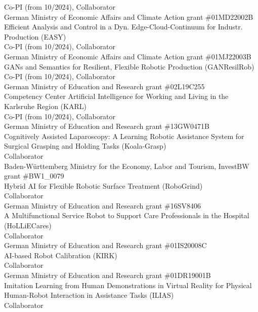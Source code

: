 \documentclass[11pt]{article} %
\begin{document}
Co-PI (from 10/2024), Collaborator\\
German Ministry of Economic Affairs and Climate Action grant \#01MD22002B\\
Efficient Analysis and Control in a Dyn. Edge-Cloud-Continuum for Industr. Production (EASY)\\
Co-PI (from 10/2024), Collaborator\\
German Ministry of Economic Affairs and Climate Action grant \#01MJ22003B\\
GANs and Semantics for Resilient, Flexible Robotic Production (GANResilRob)\\
Co-PI (from 10/2024), Collaborator\\
German Ministry of Education and Research grant \#02L19C255\\
Competency Center Artificial Intelligence for Working and Living in the Karlsruhe Region (KARL)\\
Co-PI (from 10/2024), Collaborator\\
German Ministry of Education and Research grant \#13GW0471B\\
Cognitively Assisted Laparoscopy: A Learning Robotic Assistance System for Surgical Grasping and Holding Tasks (Koala-Grasp)\\
Collaborator\\
Baden-Württemberg Ministry for the Economy, Labor and Tourism, InvestBW grant \#BW1\_0079\\
Hybrid AI for Flexible Robotic Surface Treatment (RoboGrind)\\
Collaborator\\
German Ministry of Education and Research grant \#16SV8406\\
A Multifunctional Service Robot to Support Care Professionals in the Hospital (HoLLiECares)\\
Collaborator\\
German Ministry of Education and Research grant \#01IS20008C\\
AI-based Robot Calibration (KIRK)\\
Collaborator\\
German Ministry of Education and Research grant \#01DR19001B\\
Imitation Learning from Human Demonstrations in Virtual Reality for Physical Human-Robot Interaction in Assistance Tasks (ILIAS)\\
Collaborator\\
\end{document}
